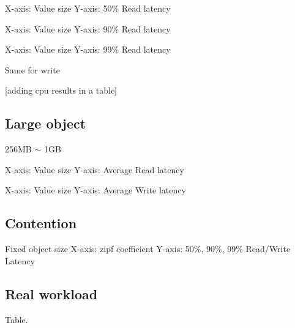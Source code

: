X-axis: Value size
Y-axis: 50\% Read latency

X-axis: Value size
Y-axis: 90\% Read latency

X-axis: Value size
Y-axis: 99\% Read latency

Same for write

[adding cpu results in a table]

\subsection{Large object}
256MB $\sim$ 1GB

X-axis: Value size
Y-axis: Average Read latency

X-axis: Value size
Y-axis: Average Write latency


\subsection{Contention}

Fixed object size
X-axis: zipf coefficient
Y-axis: 50\%, 90\%, 99\% Read/Write Latency


\subsection{Real workload}
Table.